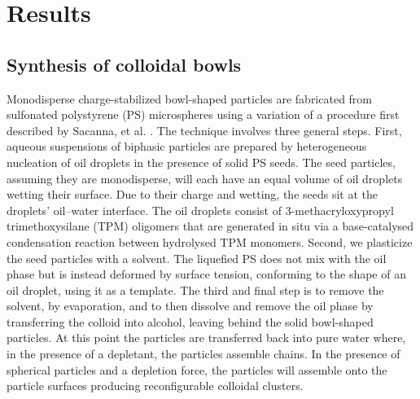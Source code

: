 \documentclass[aps,pre,preprint,superscriptaddress,nofootinbib]{revtex4-1}
\begin{document}


\section{Results}

\subsection{Synthesis of colloidal bowls}

Monodisperse charge-stabilized bowl-shaped particles are fabricated from sulfonated polystyrene (PS) microspheres using a variation of a procedure first described by Sacanna, et al. \cite{Sacanna2013Shaping}.
The technique involves three general steps.
First, aqueous suspensions of biphasic particles are prepared by heterogeneous nucleation of oil droplets in the presence of solid PS seeds.
The seed particles, assuming they are monodisperse, will each have an equal volume of oil droplets wetting their surface.
Due to their charge and wetting, the seeds sit at the droplets' oil–water interface.
The oil droplets consist of 3-methacryloxypropyl trimethoxysilane (TPM) oligomers that are generated in situ via a base-catalysed condensation reaction between hydrolysed TPM monomers.
Second, we plasticize the seed particles with a solvent.
The liquefied PS does not mix with the oil phase but is instead deformed by surface tension, conforming to the shape of an oil droplet, using it as a template.
The third and final step is to remove the solvent, by evaporation, and to then dissolve and remove the oil phase by transferring the colloid into alcohol, leaving behind the solid bowl-shaped particles.
At this point the particles are transferred back into pure water where, in the presence of a depletant, the particles assemble chains.
In the presence of spherical particles and a depletion force, the particles will assemble onto the particle surfaces producing reconfigurable colloidal clusters.
\end{document}
